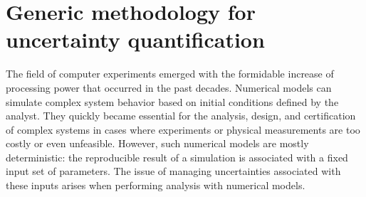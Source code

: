 \section*{Generic methodology for uncertainty quantification} 

The field of computer experiments emerged with the formidable increase of processing power that occurred in the past decades. 
Numerical models can simulate complex system behavior based on initial conditions defined by the analyst. 
They quickly became essential for the analysis, design, and certification of complex systems in cases where experiments or physical measurements are too costly or even unfeasible. 
However, such numerical models are mostly deterministic: the reproducible result of a simulation is associated with a fixed input set of parameters. 
The issue of managing uncertainties associated with these inputs arises when performing analysis with numerical models. 

